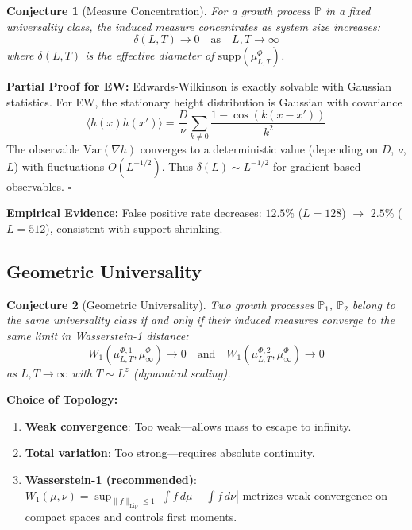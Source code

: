 \documentclass[aps,pre,reprint,amsmath,amssymb,superscriptaddress]{revtex4-2}
\newtheorem{conjecture}{Conjecture}
\newcommand{\bbP}{\mathbb{P}}
\newcommand{\supp}{\text{supp}}
\begin{document}
\begin{conjecture}[Measure Concentration]
\label{conj:concentration}
For a growth process $\bbP$ in a fixed universality class, the induced measure concentrates as system size increases:
\begin{equation}
\delta(L,T) \to 0 \quad \text{as} \quad L,T \to \infty
\end{equation}
where $\delta(L,T)$ is the effective diameter of $\supp(\mu^\Phi_{L,T})$.
\end{conjecture}

\textbf{Partial Proof for EW:} Edwards-Wilkinson is exactly solvable with Gaussian statistics. For EW, the stationary height distribution is Gaussian with covariance
\begin{equation}
\langle h(x)h(x') \rangle = \frac{D}{\nu} \sum_{k\neq 0} \frac{1-\cos(k(x-x'))}{k^2}
\end{equation}
The observable $\text{Var}(\nabla h)$ converges to a deterministic value (depending on $D$, $\nu$, $L$) with fluctuations $O(L^{-1/2})$. Thus $\delta(L) \sim L^{-1/2}$ for gradient-based observables. \hfill $\square$

\textbf{Empirical Evidence:} False positive rate decreases: $12.5\%$ ($L=128$) $\to$ $2.5\%$ ($L=512$), consistent with support shrinking.

\subsection{Geometric Universality}

\begin{conjecture}[Geometric Universality]
\label{conj:geometric}
Two growth processes $\bbP_1$, $\bbP_2$ belong to the same universality class if and only if their induced measures converge to the same limit in Wasserstein-1 distance:
\begin{equation}
W_1(\mu^{\Phi,1}_{L,T}, \mu^\Phi_\infty) \to 0 \quad \text{and} \quad W_1(\mu^{\Phi,2}_{L,T}, \mu^\Phi_\infty) \to 0
\end{equation}
as $L,T \to \infty$ with $T \sim L^z$ (dynamical scaling).
\end{conjecture}

\textbf{Choice of Topology:}
\begin{enumerate}
\item \textbf{Weak convergence}: Too weak---allows mass to escape to infinity.
\item \textbf{Total variation}: Too strong---requires absolute continuity.
\item \textbf{Wasserstein-1 (recommended)}: $W_1(\mu,\nu) = \sup_{\|f\|_{\text{Lip}}\leq 1} |\int f\, d\mu - \int f\, d\nu|$ metrizes weak convergence on compact spaces and controls first moments.
\end{enumerate}
\end{document}
